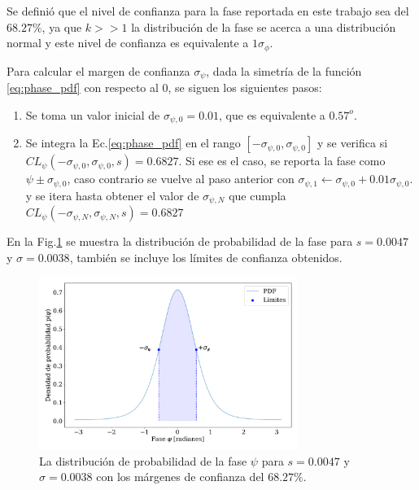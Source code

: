 
Se definió que el nivel de confianza para la fase reportada en este trabajo sea del $68.27\%$, ya que $k>>1$ la distribución de la fase se acerca a una distribución normal y este nivel de confianza es equivalente a $1\sigma_\phi$. 

Para calcular el margen de confianza $\sigma_\psi$,  dada la simetría de la función \ref{eq:phase_pdf}  con respecto al 0, se siguen los siguientes  pasos:

\begin{enumerate}
    \item Se toma un valor inicial de $\sigma_{\psi,0}=0.01$, que es equivalente a $0.57^o$.
    \item Se integra la Ec.\ref{eq:phase_pdf} en el rango $[-\sigma_{\psi,0}, \sigma_{\psi,0}]$ y se verifica si $CL_{\psi}(-\sigma_{\psi,0}, \sigma_{\psi,0},s) = 0.6827$.  Si ese es el caso, se reporta la fase como $\psi \pm \sigma_{\psi,0}$, caso contrario se vuelve al paso anterior con $\sigma_{\psi,1} \leftarrow \sigma_{\psi,0} + 0.01\sigma_{\psi,0}$. \label{paso2} y se itera hasta obtener el valor de $\sigma_{\psi,N}$ que cumpla $CL_{\psi}(-\sigma_{\psi,N}, \sigma_{\psi,N},s) = 0.6827$
\end{enumerate}

En la Fig.\ref{fig:phase_prob_ej} se muestra la distribución de probabilidad de la fase para $s=0.0047$ y $\sigma = 0.0038$, también se incluye los límites de confianza obtenidos.

\begin{figure}[H]
    \begin{small}
        \begin{center}
            \includegraphics[width=0.75\textwidth]{phase_prob_ej_v2.pdf}
        \end{center}
        \caption{La distribución de probabilidad de la fase $\psi$ para $s=0.0047$ y $\sigma = 0.0038$ con los márgenes de confianza del $68.27\%$.}
        \label{fig:phase_prob_ej}
    \end{small}
\end{figure}